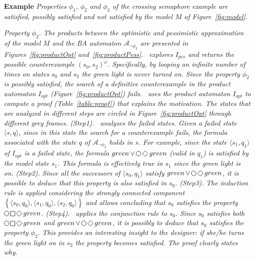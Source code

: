 \textbf{Example}
\emph{Properties $\phi_1$, $\phi_2$ and $\phi_3$ of the crossing semaphore example are satisfied, possibly satisfied and not satisfied by the model $M$ of Figure~\ref{fig:model}.}

\emph{
Property $\phi_2$.
The products between the optimistic and pessimistic approximation of the model $M$ and the BA automaton $\mathcal{A}_{\neg \phi_2}$ are presented in Figures~\ref{fig:productOpt} and~\ref{fig:productPess}.
\NAME\ explores $I_{pes}$ and returns the possible counterexample $(s_0, s_2)^\omega$.
Specifically,  by looping an infinite number of times on states $s_0$ and $s_2$ the green light is never turned on.
Since the property $\phi_2$ is possibly satisfied, the search of a definitive counterexample in the product automaton $I_{opt}$ (Figure~\ref{fig:productOpt}) fails.
\NAME\ uses the product automaton $I_{opt}$ to compute a proof (Table~\ref{table:proof}) that explains the motivation.
The states that are analyzed in different steps are circled  in Figure~\ref{fig:productOpt} through different grey frames.
(\emph{Step1}). \NAME\ analyzes the failed states.
Given a failed state $\langle s, q \rangle$, since in this state the search for a counterexample fails, the formula associated with the state $q$ of $\mathcal{A}_{\lnot\phi_2}$ holds in $s$.
For example, since the state $\langle s_1, q_1 \rangle$ of $I_{opt}$ is a failed state, the formula $green \LTLor \LTLnext \LTLfinally green$ (valid in $q_1$) is satisfied by the model state $s_1$.
This formula is effectively true in $s_1$ since the green light is on.
(\emph{Step2}). Since all the successors of $\langle s_0, q_1 \rangle$ satisfy $green \LTLor \LTLnext \LTLfinally green$, it is possible to deduce that this property is also satisfied in $s_0$.
(\emph{Step3}). 
The induction rule is applied considering the strongly connected component  $\left \{ \langle s_0, q_0 \rangle, \langle s_1, q_0 \rangle, \langle s_2, q_0 \rangle \right \}$ and  allows concluding that $s_0$ satisfies the property $\LTLnext \LTLglobally \LTLfinally green$.
(\emph{Step4}). \NAME\ applies the conjunction rule to $s_0$.
Since $s_0$ satisfies both $\LTLnext \LTLglobally \LTLfinally green$ and $green \LTLor \LTLnext \LTLfinally green$, it is possibly to deduce that $s_0$ satisfies the property $\phi_2$.
This provides an interesting insight to the designer: if she/he turns the green light on in $s_2$ the property becomes satisfied. The proof clearly states why.}

